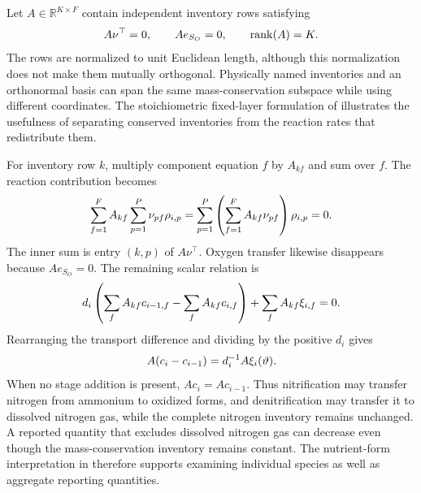 Let $A\in\mathbb R^{K\times F}$ contain independent inventory rows satisfying
\begin{equation}
\equationname{Reaction, oxygen-forcing, and rank identities of the plant invariant operator}
A\nu^\top=0,\qquad Ae_{S_O}=0,\qquad
\operatorname{rank}(A)=K.
\label{eq:plant_invariant_operator}
\end{equation}
The rows are normalized to unit Euclidean length, although this normalization does not make them mutually orthogonal. Physically named inventories and an orthonormal basis can span the same mass-conservation subspace while using different coordinates. The stoichiometric fixed-layer formulation of \citet{SturmWexler2022} illustrates the usefulness of separating conserved inventories from the reaction rates that redistribute them.

For inventory row $k$, multiply component equation $f$ by $A_{kf}$ and sum over $f$. The reaction contribution becomes
\begin{equation}
\equationname{Scalar cancellation of reaction rates in an invariant equation}
\sum_{f=1}^{F}A_{kf}\sum_{p=1}^{P}\nu_{pf}\rho_{i,p}
=\sum_{p=1}^{P}\left(\sum_{f=1}^{F}A_{kf}\nu_{pf}\right)\rho_{i,p}=0.
\end{equation}
The inner sum is entry $(k,p)$ of $A\nu^\top$. Oxygen transfer likewise disappears because $Ae_{S_O}=0$. The remaining scalar relation is
\begin{equation}
\equationname{Scalar reactor-stage invariant equation with external additions}
d_i\left(\sum_fA_{kf}c_{i-1,f}-\sum_fA_{kf}c_{i,f}\right)
+\sum_fA_{kf}\xi_{i,f}=0.
\end{equation}
Rearranging the transport difference and dividing by the positive $d_i$ gives
\begin{equation}
\equationname{Invariant inventory change across one reactor stage}
A(c_i-c_{i-1})=d_i^{-1}A\xi_i(\vartheta).
\label{eq:plant_invariant_transition}
\end{equation}
When no stage addition is present, $Ac_i=Ac_{i-1}$. Thus nitrification may transfer nitrogen from ammonium to oxidized forms, and denitrification may transfer it to dissolved nitrogen gas, while the complete nitrogen inventory remains unchanged. A reported quantity that excludes dissolved nitrogen gas can decrease even though the mass-conservation inventory remains constant. The nutrient-form interpretation in \citet{USEPA2009} therefore supports examining individual species as well as aggregate reporting quantities.

